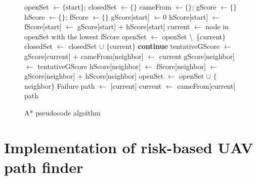 \documentclass[12pt]{report}
\begin{document}
        \begin{figure}[H]
        \begin{algorithmic}[1]
            \State openSet $\gets \{\text{start}\}$; closedSet $\gets \{\}$
            \State cameFrom $\gets \{\}$; gScore $\gets \{\}$
            \State hScore $\gets \{\}$;  fScore $\gets \{\}$
            \State gScore[start] $\gets 0$
            \State hScore[start] $\gets$ 
            \State fScore[start] $\gets$ gScore[start] + hScore[start]
                \State current $\gets$ node in openSet with the lowest fScore
                    \State \Return {}
                \EndIf
                \State openSet $\gets$ openSet \textbackslash\ $\{$current$\}$
                \State closedSet $\gets$ closedSet $\cup$ $\{$current$\}$
                        \State \textbf{continue}
                    \EndIf
                    \State tentativeGScore $\gets$ gScore[current] + 
                        \State cameFrom[neighbor] $\gets$ current
                        \State gScore[neighbor] $\gets$ tentativeGScore
                        \State hScore[neighbor] $\gets$ 
                        \State fScore[neighbor] $\gets$ gScore[neighbor] + hScore[neighbor]
                            \State openSet $\gets$ openSet $\cup$ $\{$neighbor$\}$
                        \EndIf
                    \EndIf
                \EndFor
            \EndWhile
            \State \Return Failure
        \EndFunction
        \Statex
            \State path $\gets$ [current]
                \State current $\gets$ cameFrom[current]
                \State {}
            \EndWhile
            \State \Return path
        \EndFunction
        \end{algorithmic}
        \caption{A* pseudocode algoithm}
        \end{figure}

    \section{Implementation of risk-based UAV path finder}
\end{document}
